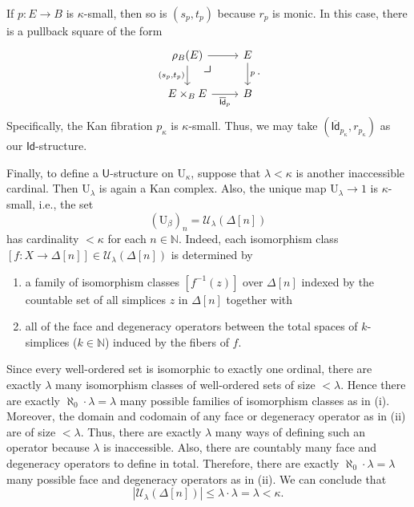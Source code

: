 \documentclass[10pt,letterpaper,cm]{nupset}
\theoremstyle{definition}
\theoremstyle{theorem}
\theoremstyle{remark}
\newcommand{\id}{\mathsf{Id}}
\newcommand{\U}{\mathsf{U}}
\newcommand{\0}{\mathbf{0}}
\newcommand{\1}{\mathbf{1}}
\newcommand{\2}{\mathbf{2}}
\newcommand{\N}{\mathbb N}
\newcommand{\be}{\begin{enumerate}}
\newcommand{\ee}{\end{enumerate}}
\begin{document}
\smallskip

If $p: E \to B$ is $\kappa$-small, then so is $\left(s_p, t_p\right)$ because $r_p$ is monic. In this case, there is a pullback square of the form
\[
\begin{tikzcd}
\rho_B(E) \arrow[r] \arrow[d, "{\left(s_p, t_p\right)}"'] \arrow[dr, phantom, "\scalebox{1.5}{\color{black}$\lrcorner$}" , very near start, color=black]
& E \arrow[d, "p"] \\
E\times_BE \arrow[r, "\overline{\id}_p"']                                      & B               
\end{tikzcd}.
\] 
Specifically,  the Kan fibration $p_{\kappa}$ is $\kappa$-small. Thus, we may take $\left(\overline{\id}_{p_{\kappa}}, r_{p_{\kappa}}\right)$ as our $\id$-structure. 

\bigskip

Finally, to define a $\U$-structure on $\mathrm{U}_{\kappa}$, suppose that $\lambda < \kappa$ is another inaccessible cardinal. Then $\mathrm{U}_{\lambda}$ is again a Kan complex. Also, the unique map $\mathrm{U}_{\lambda} \to 1$ is $\kappa$-small, i.e., the set
\[
\left(\mathrm{U}_{\beta}\right)_n  = \mathcal{U}_{\lambda}(\Delta[n])
\] has cardinality $<\kappa$ for each $n\in \N$. Indeed, each isomorphism class $\left[f: X\to \Delta[n]\right]\in  \mathcal{U}_{\lambda}(\Delta[n])$ is determined by 
\be[label=(\roman*)]
\item a family of isomorphism classes $\left[f^{-1}(z)\right]$ over $\Delta[n]$ indexed by the countable set of all simplices $z$ in $\Delta[n]$ together with
\item  all of the face and degeneracy operators between the total spaces of $k$-simplices ($k\in \N$) induced by the fibers of $f$.
\ee
Since every well-ordered set is isomorphic to exactly one ordinal, there are exactly $\lambda$ many isomorphism classes of well-ordered sets of size $< \lambda$. Hence there are exactly $\aleph_0 \cdot \lambda = \lambda$ many possible families of isomorphism classes as in (i). Moreover, the domain and codomain of any  face or degeneracy operator as in (ii) are of size $<\lambda$. Thus, there are exactly $\lambda$ many ways of defining such an operator because $\lambda$ is inaccessible. Also, there are countably many face and degeneracy operators to define in total. Therefore, there are exactly $\aleph_0 \cdot \lambda = \lambda$ many possible face and degeneracy operators as in (ii). We can conclude that 
\[
 \left\lvert{ \mathcal{U}_{\lambda}(\Delta[n])}\right\rvert \leq \lambda \cdot \lambda = \lambda <\kappa
.\] 
\end{document}
